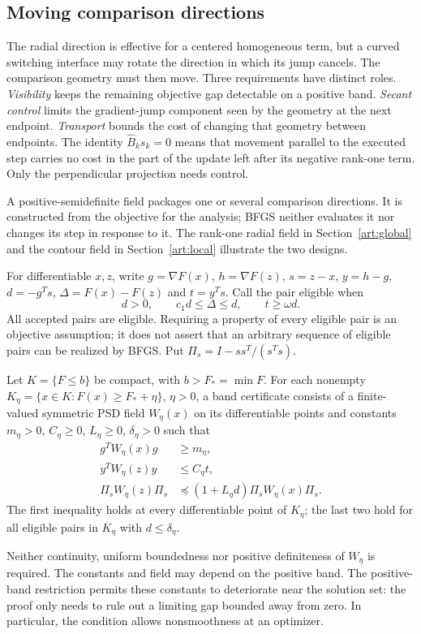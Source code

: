 \subsection{Moving comparison directions}

The radial direction is effective for a centered homogeneous term, but a
curved switching interface may rotate the direction in which its jump cancels.
The comparison geometry must then move. Three requirements have distinct
roles. \emph{Visibility} keeps the remaining objective gap detectable on a
positive band. \emph{Secant control} limits the gradient-jump component seen
by the geometry at the next endpoint. \emph{Transport} bounds the cost of
changing that geometry between endpoints. The identity $\widehat B_ks_k=0$ means that
movement parallel to the executed step carries no cost in the part of the
update left after its negative rank-one term. Only the perpendicular
projection needs control.

A positive-semidefinite field packages one or several comparison directions.
It is constructed from the objective for the analysis; BFGS neither evaluates
it nor changes its step in response to it. The rank-one radial field in
Section~\ref{art:global} and the contour field in
Section~\ref{art:local} illustrate the two designs.

For differentiable $x,z$, write $g=\nabla F(x)$, $h=\nabla F(z)$,
$s=z-x$, $y=h-g$, $d=-g^Ts$, $\Delta=F(x)-F(z)$ and $t=y^Ts$.
Call the pair eligible when
\[
 d>0,\qquad c_1d\le\Delta\le d,\qquad t\ge\omega d.
\]
All accepted pairs are eligible. Requiring a property of every eligible pair
is an objective assumption; it does not assert that an arbitrary sequence of
eligible pairs can be realized by BFGS. Put
$\Pi_s=I-ss^T/(s^Ts)$.

\begin{definition}\label{art:band-certificate}
Let $K=\{F\le b\}$ be compact, with $b>F_*=\min F$.
For each nonempty $K_\eta=\{x\in K:F(x)\ge F_*+\eta\}$, $\eta>0$,
a band certificate consists of a finite-valued symmetric PSD field
$W_\eta(x)$ on its differentiable points and constants
$m_\eta>0$, $C_\eta\ge0$, $L_\eta\ge0$, $\delta_\eta>0$ such that
\begin{align}
 g^TW_\eta(x)g&\ge m_\eta,\label{art:visibility}\\
 y^TW_\eta(z)y&\le C_\eta t,\label{art:secant-control}\\
 \Pi_sW_\eta(z)\Pi_s&\preceq
 (1+L_\eta d)\Pi_sW_\eta(x)\Pi_s.\label{art:transport}
\end{align}
The first inequality holds at every differentiable point of $K_\eta$;
the last two hold for all eligible pairs in $K_\eta$ with $d\le\delta_\eta$.
\end{definition}
Neither continuity, uniform boundedness nor positive definiteness of $W_\eta$
is required. The constants and field may depend on the positive band.
The positive-band restriction permits these constants to deteriorate near the
solution set: the proof only needs to rule out a limiting gap bounded away
from zero. In particular, the condition allows nonsmoothness at an optimizer.

